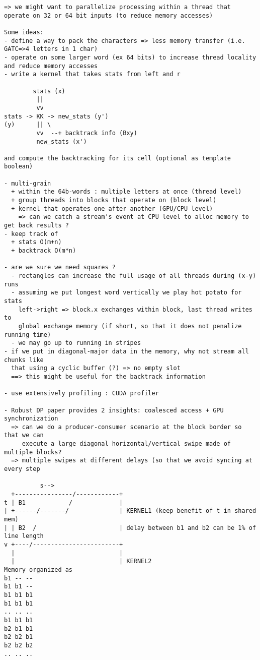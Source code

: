 \documentclass[11pt]{article}
\begin{document}
\begin{verbatim}
=> we might want to parallelize processing within a thread that operate on 32 or 64 bit inputs (to reduce memory accesses)

Some ideas:
- define a way to pack the characters => less memory transfer (i.e. GATC=>4 letters in 1 char)
- operate on some larger word (ex 64 bits) to increase thread locality and reduce memory accesses
- write a kernel that takes stats from left and r

		stats (x)
		 ||
		 vv
stats -> KK -> new_stats (y')
(y)		 || \
		 vv  --+ backtrack info (Bxy)
		 new_stats (x')

and compute the backtracking for its cell (optional as template boolean)

- multi-grain
  + within the 64b-words : multiple letters at once (thread level)
  + group threads into blocks that operate on (block level)
  + kernel that operates one after another (GPU/CPU level)
    => can we catch a stream's event at CPU level to alloc memory to get back results ?
- keep track of
  + stats O(m+n)
  + backtrack O(m*n)

- are we sure we need squares ?
  - rectangles can increase the full usage of all threads during (x-y) runs
  - assuming we put longest word vertically we play hot potato for stats
    left->right => block.x exchanges within block, last thread writes to
    global exchange memory (if short, so that it does not penalize running time)
  - we may go up to running in stripes
- if we put in diagonal-major data in the memory, why not stream all chunks like
  that using a cyclic buffer (?) => no empty slot
  ==> this might be useful for the backtrack information

- use extensively profiling : CUDA profiler

- Robust DP paper provides 2 insights: coalesced access + GPU synchronization
  => can we do a producer-consumer scenario at the block border so that we can
     execute a large diagonal horizontal/vertical swipe made of multiple blocks?
  => multiple swipes at different delays (so that we avoid syncing at every step

          s-->
  +----------------/------------+
t | B1            /             |
| +------/-------/              | KERNEL1 (keep benefit of t in shared mem)
| | B2  /                       | delay between b1 and b2 can be 1% of line length
v +----/------------------------+
  |                             |
  |                             | KERNEL2
Memory organized as
b1 -- --
b1 b1 --
b1 b1 b1
b1 b1 b1
.. .. ..
b1 b1 b1
b2 b1 b1
b2 b2 b1
b2 b2 b2
.. .. ..


\end{verbatim}
\end{document}
